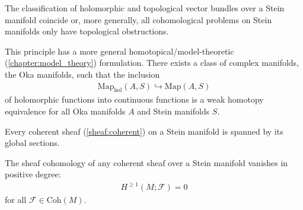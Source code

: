     \begin{property}
        The classification of holomorphic and topological vector bundles over a Stein manifold coincide or, more generally, all cohomological problems on Stein manifolds only have topological obstructions.
    \end{property}
    \begin{remark}
        This principle has a more general homotopical/model-theoretic (\cref{chapter:model_theory}) formulation. There exists a class of complex manifolds, the Oka manifolds, such that the inclusion
        \begin{gather}
            \mathrm{Map}_\text{hol}(A,S)\hookrightarrow\mathrm{Map}(A,S)
        \end{gather}
        of holomorphic functions into continuous functions is a weak homotopy equivalence for all Oka manifolds $A$ and Stein manifolds $S$.
    \end{remark}

    \begin{theorem}
        Every coherent sheaf (\cref{sheaf:coherent}) on a Stein manifold is spanned by its global sections.
    \end{theorem}
    \begin{theorem}
        The sheaf cohomology of any coherent sheaf over a Stein manifold vanishes in positive degree:
        \begin{gather}
            H^{\geq1}(M;\mathcal{F})=0
        \end{gather}
        for all $\mathcal{F}\in\mathrm{Coh}(M)$.
    \end{theorem}

